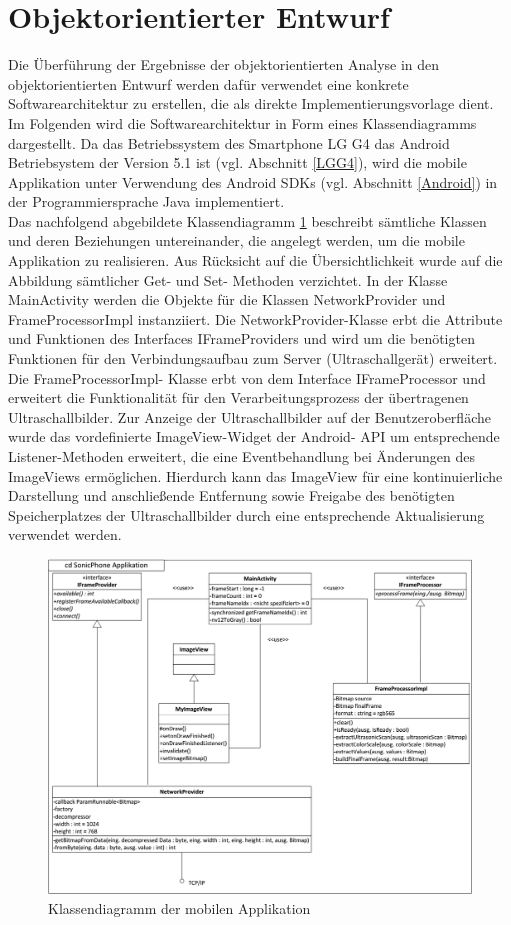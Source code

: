 \section{Objektorientierter Entwurf}
Die Überführung der Ergebnisse der objektorientierten Analyse in den  objektorientierten Entwurf werden dafür verwendet eine konkrete Softwarearchitektur zu erstellen, die als direkte Implementierungsvorlage dient. Im Folgenden wird die Softwarearchitektur in Form eines Klassendiagramms dargestellt. Da das Betriebssystem des Smartphone LG G4 das Android Betriebsystem der Version 5.1 ist (vgl. Abschnitt \ref{LGG4}), wird die mobile Applikation unter Verwendung des Android SDKs (vgl. Abschnitt \ref{Android}) in der Programmiersprache Java implementiert.  \\
Das nachfolgend abgebildete Klassendiagramm \ref{fig:cd_mobileApplikation} beschreibt sämtliche Klassen und deren Beziehungen untereinander, die angelegt werden, um die mobile Applikation zu realisieren. Aus Rücksicht auf die Übersichtlichkeit wurde auf die Abbildung sämtlicher Get- und Set- Methoden verzichtet. In der Klasse MainActivity werden die Objekte für die Klassen NetworkProvider und FrameProcessorImpl instanziiert. Die NetworkProvider-Klasse erbt die Attribute und Funktionen des Interfaces IFrameProviders und wird um die benötigten Funktionen für den Verbindungsaufbau zum Server (Ultraschallgerät) erweitert. Die FrameProcessorImpl- Klasse erbt von dem Interface IFrameProcessor und erweitert die Funktionalität für den Verarbeitungsprozess der übertragenen Ultraschallbilder. Zur Anzeige der Ultraschallbilder auf der Benutzeroberfläche wurde das vordefinierte ImageView-Widget der Android- API um entsprechende Listener-Methoden erweitert, die eine Eventbehandlung bei Änderungen des ImageViews ermöglichen. Hierdurch kann das ImageView  für eine kontinuierliche Darstellung und anschließende Entfernung sowie Freigabe des benötigten Speicherplatzes der Ultraschallbilder durch eine entsprechende Aktualisierung verwendet werden.  

\begin{figure}[H] 
\centering
\includegraphics[width=1\textwidth]{Bilder/objektorientierteAnalyseundEntwurf/cd_mobileApplikation}
\caption{{\small Klassendiagramm der mobilen Applikation}}
\label{fig:cd_mobileApplikation}
\end{figure}
